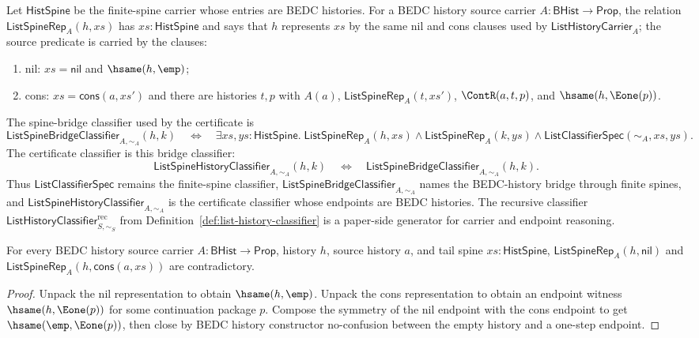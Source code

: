 \begin{definition}\label{def:list-spine-representation}
Let $\mathsf{HistSpine}$ be the finite-spine carrier whose entries are BEDC histories. For a BEDC history source carrier $A:\mathsf{BHist}\to\mathsf{Prop}$, the relation $\mathsf{ListSpineRep}_A(h,xs)$ has $xs:\mathsf{HistSpine}$ and says that $h$ represents $xs$ by the same nil and cons clauses used by $\mathsf{ListHistoryCarrier}_A$; the source predicate is carried by the clauses:
\begin{enumerate}
  \item nil: $xs=\mathsf{nil}$ and $\hsame(h,\emp)$;
  \item cons: $xs=\mathsf{cons}(a,xs')$ and there are histories $t,p$ with $A(a)$, $\mathsf{ListSpineRep}_A(t,xs')$, $\ContR(a,t,p)$, and $\hsame(h,\Eone(p))$.
\end{enumerate}
The spine-bridge classifier used by the certificate is
$$
  \mathsf{ListSpineBridgeClassifier}_{A,\sim_A}(h,k)
  \quad\Longleftrightarrow\quad
  \exists xs,ys:\mathsf{HistSpine}.\;
  \mathsf{ListSpineRep}_A(h,xs)\land
  \mathsf{ListSpineRep}_A(k,ys)\land
  \mathsf{ListClassifierSpec}(\sim_A,xs,ys).
$$
The certificate classifier is this bridge classifier:
$$
  \mathsf{ListSpineHistoryClassifier}_{A,\sim_A}(h,k)
  \quad\Longleftrightarrow\quad
  \mathsf{ListSpineBridgeClassifier}_{A,\sim_A}(h,k).
$$
Thus $\mathsf{ListClassifierSpec}$ remains the finite-spine classifier, $\mathsf{ListSpineBridgeClassifier}_{A,\sim_A}$ names the BEDC-history bridge through finite spines, and $\mathsf{ListSpineHistoryClassifier}_{A,\sim_A}$ is the certificate classifier whose endpoints are BEDC histories. The recursive classifier $\mathsf{ListHistoryClassifier}^{\mathrm{rec}}_{S,\sim_S}$ from Definition~\ref{def:list-history-classifier} is a paper-side generator for carrier and endpoint reasoning.
\end{definition}

\begin{theorem}\label{thm:list-spine-rep-nil-cons-no-confusion}
For every BEDC history source carrier $A:\mathsf{BHist}\to\mathsf{Prop}$, history $h$, source history $a$, and tail spine $xs:\mathsf{HistSpine}$, $\mathsf{ListSpineRep}_A(h,\mathsf{nil})$ and $\mathsf{ListSpineRep}_A(h,\mathsf{cons}(a,xs))$ are contradictory.
\end{theorem}
\begin{proof}
Unpack the nil representation to obtain $\hsame(h,\emp)$. Unpack the cons representation to obtain an endpoint witness $\hsame(h,\Eone(p))$ for some continuation package $p$. Compose the symmetry of the nil endpoint with the cons endpoint to get $\hsame(\emp,\Eone(p))$, then close by BEDC history constructor no-confusion between the empty history and a one-step endpoint.
\end{proof}

